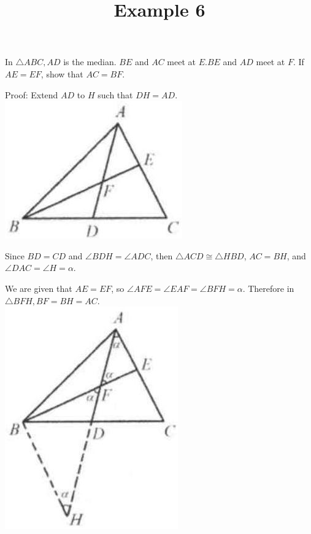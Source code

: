 \documentclass{article}
\title{Example 6}
\date{}
\begin{document}
\maketitle

In \(\triangle A B C, A D\) is the median. \(B E\) and \(A C\) meet at \(E . B E\) and \(A D\) meet at \(F\). If \(A E=E F\), show that \(A C=B F\).

Proof:
Extend \(A D\) to \(H\) such that \(D H=A D\).\\
\centering
\includegraphics[width=\textwidth]{images/problem_image_1.jpg}

Since \(B D=C D\) and \(\angle B D H=\angle A D C\), then \(\triangle A C D \cong \triangle H B D\), \(A C=B H\), and \(\angle D A C=\angle H=\alpha\).

We are given that \(A E=E F\), so \(\angle A F E=\angle E A F=\angle B F H=\alpha\). Therefore in \(\triangle B F H, B F=B H=A C\).\\
\centering
\includegraphics[width=\textwidth]{images/reasoning_image_1.jpg}
\end{document}
